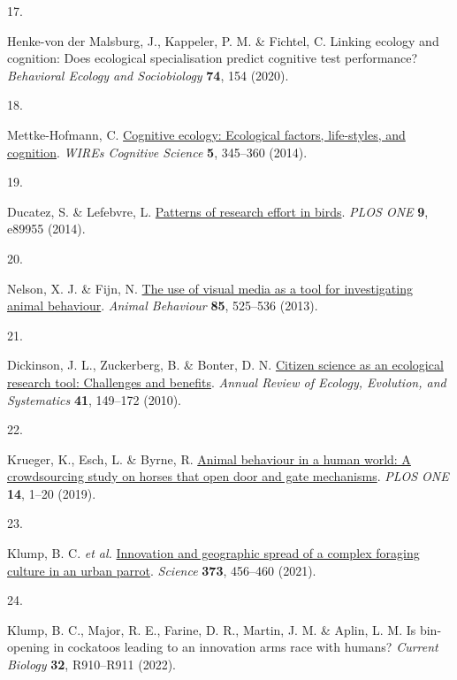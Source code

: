 \documentclass[
  man,floatsintext]{apa6}
\newlength{\cslhangindent}
\newlength{\csllabelwidth}
\newlength{\cslentryspacingunit} %
\newenvironment{CSLReferences}[2] %
 {%
  \setlength{\parindent}{0pt}
  \ifodd #1
  \let\oldpar\par
  \def\par{\hangindent=\cslhangindent\oldpar}
  \fi
  \setlength{\parskip}{#2\cslentryspacingunit}
 }%
 {}
\newcommand{\CSLLeftMargin}[1]{\parbox[t]{\csllabelwidth}{#1}}
\newcommand{\CSLRightInline}[1]{\parbox[t]{\linewidth - \csllabelwidth}{#1}\break}
\begin{document}
\begin{CSLReferences}{0}{0}
\leavevmode{}%
\CSLLeftMargin{17. }%
\CSLRightInline{Henke-von der Malsburg, J., Kappeler, P. M. \& Fichtel, C. Linking ecology and cognition: Does ecological specialisation predict cognitive test performance? \emph{Behavioral Ecology and Sociobiology} \textbf{74}, 154 (2020).}

\leavevmode{}%
\CSLLeftMargin{18. }%
\CSLRightInline{Mettke-Hofmann, C. \href{https://doi.org/10.1002/wcs.1289}{Cognitive ecology: Ecological factors, life-styles, and cognition}. \emph{WIREs Cognitive Science} \textbf{5}, 345--360 (2014).}

\leavevmode{}%
\CSLLeftMargin{19. }%
\CSLRightInline{Ducatez, S. \& Lefebvre, L. \href{https://doi.org/10.1371/journal.pone.0089955}{Patterns of research effort in birds}. \emph{PLOS ONE} \textbf{9}, e89955 (2014).}

\leavevmode{}%
\CSLLeftMargin{20. }%
\CSLRightInline{Nelson, X. J. \& Fijn, N. \href{https://doi.org/10.1016/j.anbehav.2012.12.009}{The use of visual media as a tool for investigating animal behaviour}. \emph{Animal Behaviour} \textbf{85}, 525--536 (2013).}

\leavevmode{}%
\CSLLeftMargin{21. }%
\CSLRightInline{Dickinson, J. L., Zuckerberg, B. \& Bonter, D. N. \href{https://doi.org/10.1146/annurev-ecolsys-102209-144636}{Citizen science as an ecological research tool: Challenges and benefits}. \emph{Annual Review of Ecology, Evolution, and Systematics} \textbf{41}, 149--172 (2010).}

\leavevmode{}%
\CSLLeftMargin{22. }%
\CSLRightInline{Krueger, K., Esch, L. \& Byrne, R. \href{https://doi.org/10.1371/journal.pone.0218954}{Animal behaviour in a human world: A crowdsourcing study on horses that open door and gate mechanisms}. \emph{PLOS ONE} \textbf{14}, 1--20 (2019).}

\leavevmode{}%
\CSLLeftMargin{23. }%
\CSLRightInline{Klump, B. C. \emph{et al.} \href{https://doi.org/10.1126/science.abe7808}{Innovation and geographic spread of a complex foraging culture in an urban parrot}. \emph{Science} \textbf{373}, 456--460 (2021).}

\leavevmode{}%
\CSLLeftMargin{24. }%
\CSLRightInline{Klump, B. C., Major, R. E., Farine, D. R., Martin, J. M. \& Aplin, L. M. Is bin-opening in cockatoos leading to an innovation arms race with humans? \emph{Current Biology} \textbf{32}, R910--R911 (2022).}


\end{CSLReferences}
\end{document}
